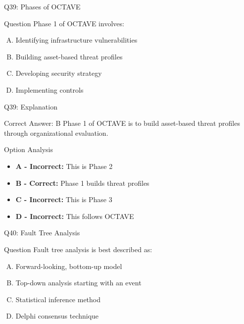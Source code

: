 \documentclass{beamer}
\begin{document}
	\begin{frame}{Q39: Phases of OCTAVE}
		\begin{block}{Question}
			Phase 1 of OCTAVE involves:
		\end{block}
		\begin{enumerate}[(A)]
			\item Identifying infrastructure vulnerabilities
			\item Building asset-based threat profiles
			\item Developing security strategy
			\item Implementing controls
		\end{enumerate}
	\end{frame}
	
	\begin{frame}{Q39: Explanation}
		\begin{block}{Correct Answer: B}
			Phase 1 of OCTAVE is to build asset-based threat profiles through organizational evaluation.
		\end{block}
		\begin{block}{Option Analysis}
			\begin{itemize}
				\item \textbf{A - Incorrect:} This is Phase 2
				\item \textbf{B - Correct:} Phase 1 builds threat profiles
				\item \textbf{C - Incorrect:} This is Phase 3
				\item \textbf{D - Incorrect:} This follows OCTAVE
			\end{itemize}
		\end{block}
	\end{frame}
	
	\begin{frame}{Q40: Fault Tree Analysis}
		\begin{block}{Question}
			Fault tree analysis is best described as:
		\end{block}
		\begin{enumerate}[(A)]
			\item Forward-looking, bottom-up model
			\item Top-down analysis starting with an event
			\item Statistical inference method
			\item Delphi consensus technique
		\end{enumerate}
	\end{frame}
	
\end{document}
